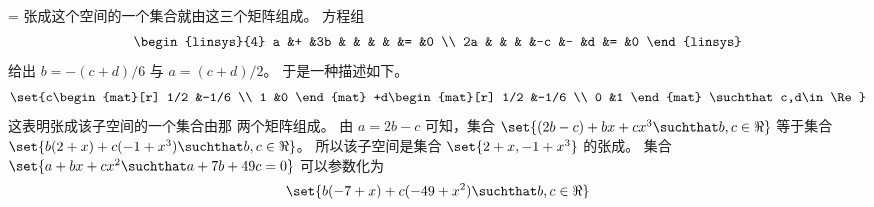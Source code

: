 \begin{exercises}
\begin{answer}
\begin{exparts}
                     = \)
            张成这个空间的一个集合就由这三个矩阵组成。
        \partsitem 方程组
          \begin{equation*}
            \begin{linsys}{4}
              a  &+  &3b  &   &   &  &  &=  &0  \\
             2a  &   &    &   &-c &- &d &=  &0
            \end{linsys}
          \end{equation*}
          给出 \( b=-(c+d)/6 \) 与 \( a=(c+d)/2 \)。
          于是一种描述如下。
          \begin{equation*}
            \set{c\begin{mat}[r]
                       1/2  &-1/6  \\
                       1    &0
                      \end{mat}
                     +d\begin{mat}[r]
                       1/2  &-1/6  \\
                       0    &1
                      \end{mat}  \suchthat c,d\in\Re}
           \end{equation*}
          这表明张成该子空间的一个集合由那
          两个矩阵组成。
        \partsitem 由 $a=2b-c$ 可知，集合
           \( \set{(2b-c)+bx+cx^3 \suchthat b,c\in\Re} \)
           等于集合
           \( \set{b(2+x)+c(-1+x^3) \suchthat b,c\in\Re}  \)。
           所以该子空间是集合 $\set{2+x, -1+x^3}$ 的张成。
        \partsitem 集合
          \( \set{a+bx+cx^2\suchthat a+7b+49c=0} \)
          可以参数化为
          \begin{equation*}
            \set{b(-7+x)+c(-49+x^2)\suchthat b,c\in\Re}
          \end{equation*}

\end{exparts}
\end{answer}
\end{exercises}
